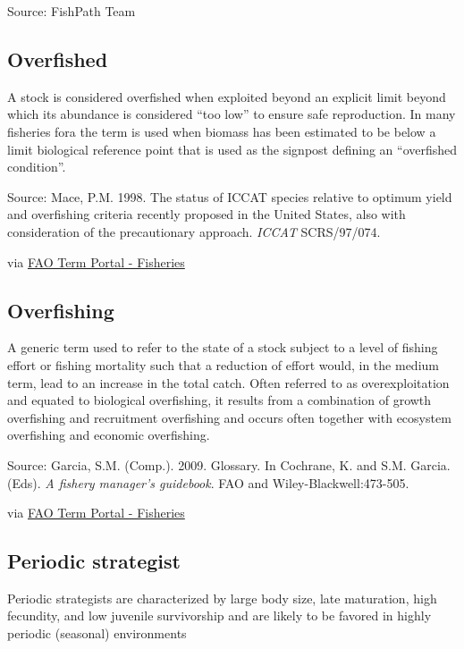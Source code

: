 \documentclass[
  11pt,
]{book}
\begin{document}
Source: FishPath Team

\hypertarget{overfished}{%
\subsection{Overfished}\label{overfished}}

A stock is considered overfished when exploited beyond an explicit limit beyond which its abundance is considered ``too low'' to ensure safe reproduction. In many fisheries fora the term is used when biomass has been estimated to be below a limit biological reference point that is used as the signpost defining an ``overfished condition''.

Source: Mace, P.M. 1998. The status of ICCAT species relative to optimum yield and overfishing criteria recently proposed in the United States, also with consideration of the precautionary approach. \emph{ICCAT} SCRS/97/074.

via \href{http://www.fao.org/fishery/glossary/en}{FAO Term Portal - Fisheries}

\hypertarget{overfishing}{%
\subsection{Overfishing}\label{overfishing}}

A generic term used to refer to the state of a stock subject to a level of fishing effort or fishing mortality such that a reduction of effort would, in the medium term, lead to an increase in the total catch. Often referred to as overexploitation and equated to biological overfishing, it results from a combination of growth overfishing and recruitment overfishing and occurs often together with ecosystem overfishing and economic overfishing.

Source: Garcia, S.M. (Comp.). 2009. Glossary. In Cochrane, K. and S.M. Garcia. (Eds). \emph{A fishery manager's guidebook}. FAO and Wiley-Blackwell:473-505.

via \href{http://www.fao.org/fishery/glossary/en}{FAO Term Portal - Fisheries}

\hypertarget{periodic-strategist}{%
\subsection{Periodic strategist}\label{periodic-strategist}}

Periodic strategists are characterized by large body size, late maturation, high fecundity, and low juvenile survivorship and are likely to be favored in highly periodic (seasonal) environments
\end{document}
